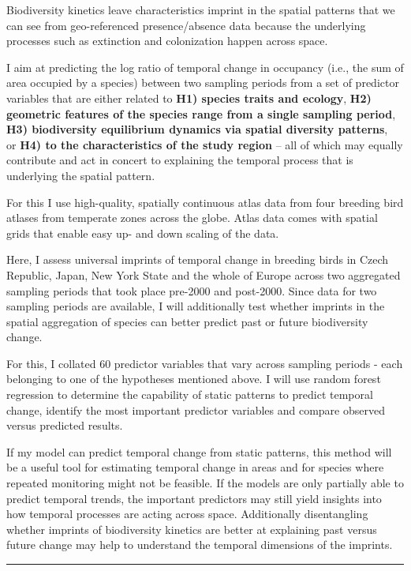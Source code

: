 \documentclass[
  letterpaper,
  DIV=11,
  numbers=noendperiod]{scrartcl}
\begin{document}
Biodiversity kinetics leave characteristics imprint in the spatial
patterns that we can see from geo-referenced presence/absence data
because the underlying processes such as extinction and colonization
happen across space.

I aim at predicting the log ratio of temporal change in occupancy (i.e.,
the sum of area occupied by a species) between two sampling periods from
a set of predictor variables that are either related to \textbf{H1)
species traits and ecology}, \textbf{H2)~ geometric features of the
species range from a single sampling period}, \textbf{H3) biodiversity
equilibrium dynamics via spatial diversity patterns},~ or \textbf{H4) to
the characteristics of the study region} -- all of which may equally
contribute and act in concert to explaining the temporal process that is
underlying the spatial pattern.

For this I use high-quality, spatially continuous atlas data from four
breeding bird atlases from temperate zones across the globe. Atlas data
comes with spatial grids that enable easy up- and down scaling of the
data.

Here, I assess universal imprints of temporal change in breeding birds
in Czech Republic, Japan, New York State and the whole of Europe across
two aggregated sampling periods that took place pre-2000 and post-2000.
Since data for two sampling periods are available, I will additionally
test whether imprints in the spatial aggregation of species can better
predict past or future biodiversity change.

For this, I collated 60 predictor variables that vary across sampling
periods - each belonging to one of the hypotheses mentioned above. I
will use random forest regression to determine the capability of static
patterns to predict temporal change, identify the most important
predictor variables and compare observed versus predicted results.

If my model can predict temporal change from static patterns, this
method will be a useful tool for estimating temporal change in areas and
for species where repeated monitoring might not be feasible. If the
models are only partially able to predict temporal trends, the important
predictors may still yield insights into how temporal processes are
acting across space. Additionally disentangling whether imprints of
biodiversity kinetics are better at explaining past versus future change
may help to understand the temporal dimensions of the imprints.

\begin{center}\rule{0.5\linewidth}{0.5pt}\end{center}
\end{document}
